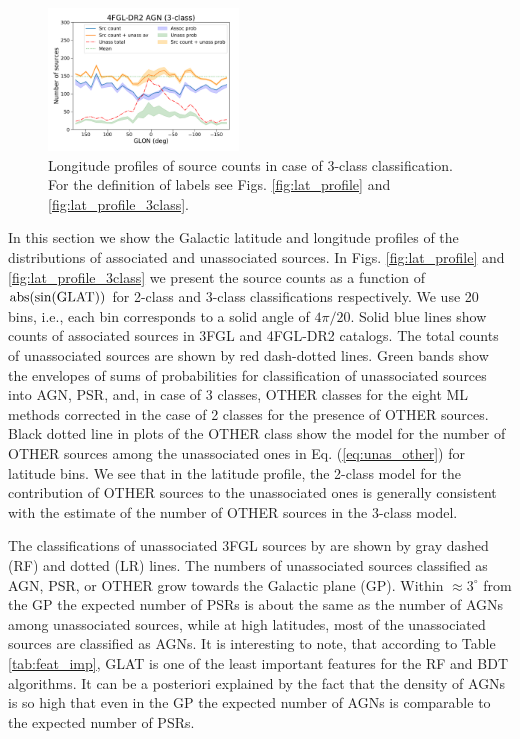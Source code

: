 \documentclass{aa}
\begin{document}
\begin{figure}[h]
\includegraphics[width=0.45\textwidth]{plots/lon_profile_AGN_4FGL-DR2_3classes.pdf}
\caption{Longitude profiles of source counts in case of 3-class classification. For the definition of labels see Figs. \ref{fig:lat_profile} and \ref{fig:lat_profile_3class}.}  
\label{fig:lon_profile_3class}
\end{figure}


In this section we show the Galactic latitude and longitude profiles of the distributions of associated and unassociated sources.
In Figs. \ref{fig:lat_profile} and \ref{fig:lat_profile_3class} we present the source counts as a function of ${\rm abs(sin(GLAT))}$ 
for 2-class and 3-class classifications respectively.
We use 20 bins, i.e., each bin corresponds to a solid angle of $4 \pi / 20$. 
Solid blue lines show counts of associated sources in 3FGL and 4FGL-DR2  catalogs.
The total counts of unassociated sources are shown by red dash-dotted lines.
Green bands show the envelopes of sums of probabilities for classification of unassociated sources into AGN, PSR, and, in case of 3 classes, OTHER classes for the eight ML methods corrected in the case of 2 classes for the presence of OTHER sources.
Black dotted line in plots of the OTHER class show the model for the number of OTHER sources among the unassociated ones
in Eq. (\ref{eq:unas_other}) for latitude bins.
We see that in the latitude profile, the 2-class model for the contribution of OTHER sources to the unassociated ones is generally consistent with the estimate of the number of OTHER sources in the 3-class model.

The classifications of unassociated 3FGL sources by \cite{2016ApJ...820....8S} are shown by gray dashed (RF) and dotted (LR) lines.
The numbers of unassociated sources classified as AGN, PSR, or OTHER grow towards the Galactic plane (GP).
Within $\approx 3^\circ$ from the GP the expected number of PSRs is about the same as the number of AGNs among unassociated sources, while at high latitudes, most of the unassociated sources are classified as AGNs.
It is interesting to note, that according to Table \ref{tab:feat_imp}, GLAT is one of the least important features for the RF and BDT algorithms.
It can be a posteriori explained by the fact that the density of AGNs is so high that even in the GP the expected number of AGNs is comparable to the expected number of PSRs.
\end{document}
